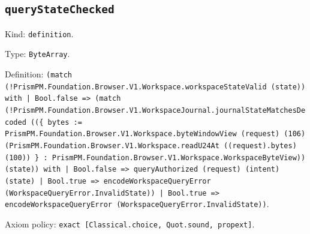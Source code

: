 \documentclass[11pt]{article}
\begin{document}
\subsection*{\texttt{queryStateChecked}}
\noindent Kind: \texttt{definition}.\par
\noindent Type: \texttt{ByteArray}.\par
\noindent Definition: \texttt{(match (!PrismPM.Foundation.Browser.V1.Workspace.workspaceStateValid (state)) with | Bool.false => (match (!PrismPM.Foundation.Browser.V1.WorkspaceJournal.journalStateMatchesDecoded ((\{ bytes := PrismPM.Foundation.Browser.V1.Workspace.byteWindowView (request) (106) (PrismPM.Foundation.Browser.V1.Workspace.readU24At ((request).bytes) (100)) \} : PrismPM.Foundation.Browser.V1.Workspace.WorkspaceByteView)) (state)) with | Bool.false => queryAuthorized (request) (intent) (state) | Bool.true => encodeWorkspaceQueryError (WorkspaceQueryError.InvalidState)) | Bool.true => encodeWorkspaceQueryError (WorkspaceQueryError.InvalidState))}.\par
\noindent Axiom policy: \texttt{exact [Classical.choice, Quot.sound, propext]}.\par
\end{document}
